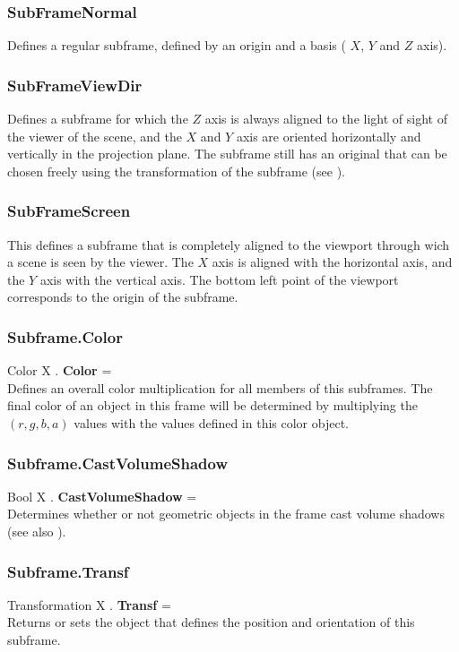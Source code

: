 \subsubsection{SubFrameNormal \label{T:SubFrameType|SubFrameNormal}}
Defines a regular subframe, defined by an origin and a basis ( $X$, $Y$ and $Z$ axis).

\subsubsection{SubFrameViewDir \label{T:SubFrameType|SubFrameViewDir}}
Defines a subframe for which the $Z$ axis is always aligned to the light of sight of the viewer of the scene, and the $X$ and $Y$ axis are oriented horizontally and vertically in the projection plane. The subframe still has an original that can be chosen freely using the transformation of the subframe (see ).

\subsubsection{SubFrameScreen \label{T:SubFrameType|SubFrameScreen}}
This defines a subframe that is completely aligned to the viewport through wich a scene is seen by the viewer. The $X$ axis is aligned with the horizontal axis, and the $Y$ axis with the vertical axis. The bottom left point of the viewport corresponds to the origin of the subframe.

\subsubsection{Subframe.Color \label{F:Subframe:Color}}
Color X . \textbf{Color} = \\
Defines an overall color multiplication for all members of this subframes. The final color of an object in this frame will be determined by multiplying the $(r,g,b,a)$ values with the values defined in this color object.

\subsubsection{Subframe.CastVolumeShadow \label{F:Subframe:CastVolumeShadow}}
Bool X . \textbf{CastVolumeShadow} = \\
Determines whether or not geometric objects in the frame cast volume shadows (see also ).

\subsubsection{Subframe.Transf \label{F:Subframe:Transf}}
Transformation X . \textbf{Transf} = \\
Returns or sets the  object that defines the position and orientation of this subframe.

